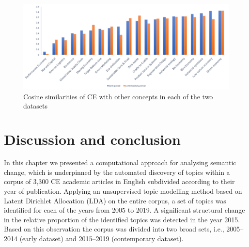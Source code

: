 \documentclass[output=paper]{langsci/langscibook}
\begin{document}
\begin{figure}
\includegraphics[width=\textwidth]{figures/MAHANTY_Cosine similarities.png}
\caption{Cosine similarities of CE with other concepts in each of the two datasets}\label{ch03:fig7}
\end{figure}

\section{Discussion and conclusion}\label{ch03:discussion}
In this chapter we presented a computational approach for analysing semantic change, which is underpinned by the automated discovery of topics within a corpus of 3,300 CE academic articles in English subdivided according to their year of publication. Applying an unsupervised topic modelling method based on Latent Dirichlet Allocation (LDA) on the entire corpus, a set of topics was identified for each of the years from 2005 to 2019. A significant structural change in the relative proportion of the identified topics was detected in the year 2015. Based on this observation the corpus was divided into two broad sets, i.e., 2005--2014 (early dataset) and 2015--2019 (contemporary dataset). 
\end{document}
